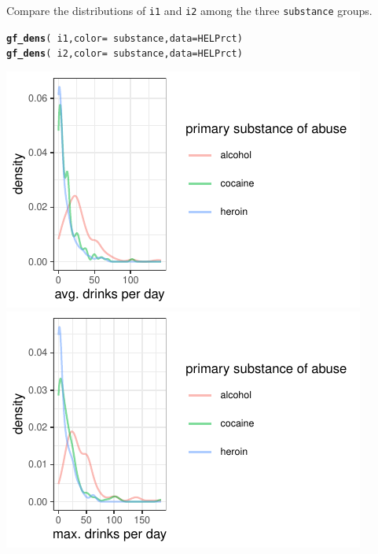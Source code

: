 \documentclass[twoside]{book}\usepackage[]{graphicx}\usepackage[]{xcolor}
\makeatletter
\def\maxwidth{ %
  \ifdim\Gin@nat@width>\linewidth
    \linewidth
  \else
    \Gin@nat@width
  \fi
}
\newcommand{\hlopt}[1]{\textcolor[rgb]{0,0,0}{#1}}%
\newcommand{\hlstd}[1]{\textcolor[rgb]{0.345,0.345,0.345}{#1}}%
\newcommand{\hlkwc}[1]{\textcolor[rgb]{0.333,0.667,0.333}{#1}}%
\newcommand{\hlkwd}[1]{\textcolor[rgb]{0.737,0.353,0.396}{\textbf{#1}}}%
\newenvironment{kframe}{%
 \def\at@end@of@kframe{}%
 \ifinner\ifhmode%
  \def\at@end@of@kframe{\end{minipage}}%
  \begin{minipage}{\columnwidth}%
 \fi\fi%
 \def\FrameCommand##1{\hskip\@totalleftmargin \hskip-\fboxsep
 \colorbox{shadecolor}{##1}\hskip-\fboxsep
     \hskip-\linewidth \hskip-\@totalleftmargin \hskip\columnwidth}%
 \MakeFramed {\advance\hsize-\width
   \@totalleftmargin\z@ \linewidth\hsize
   \@setminipage}}%
 {\par\unskip\endMakeFramed%
 \at@end@of@kframe}
\newenvironment{knitrout}{}{} %
\newcommand{\variable}[1]{{\color{green!50!black}\texttt{#1}}}
\makeatother
\begin{document}
\begin{problem}
	Compare the distributions of \variable{i1} and \variable{i2} among 
	the three \variable{substance} groups.
\end{problem}
\begin{solution}
\begin{knitrout}
\color{fgcolor}\begin{kframe}
\begin{alltt}
\hlkwd{gf_dens}\hlstd{(} \hlopt{~}\hlstd{i1,} \hlkwc{color} \hlstd{=} \hlopt{~} \hlstd{substance,} \hlkwc{data} \hlstd{= HELPrct )}
\hlkwd{gf_dens}\hlstd{(} \hlopt{~}\hlstd{i2,} \hlkwc{color} \hlstd{=} \hlopt{~} \hlstd{substance,} \hlkwc{data} \hlstd{= HELPrct )}
\end{alltt}
\end{kframe}

{\centering \includegraphics[width=\maxwidth]{figures/fig-unnamed-chunk-27-1} 
\includegraphics[width=\maxwidth]{figures/fig-unnamed-chunk-27-2} 

}
\end{knitrout}
\end{solution}
\end{document}
